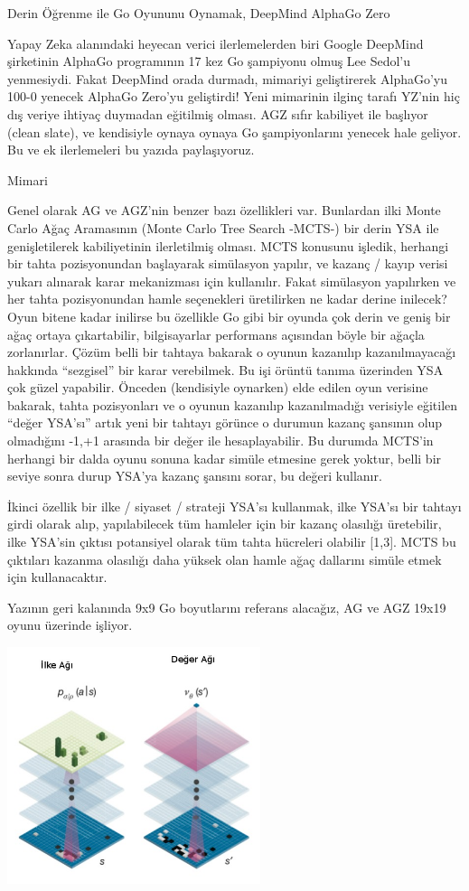 \documentclass[12pt,fleqn]{article}\usepackage{../../common}
\begin{document}
Derin Öğrenme ile Go Oyununu Oynamak, DeepMind AlphaGo Zero

Yapay Zeka alanındaki heyecan verici ilerlemelerden biri Google DeepMind
şirketinin AlphaGo programının 17 kez Go şampiyonu olmuş Lee Sedol'u
yenmesiydi. Fakat DeepMind orada durmadı, mimariyi geliştirerek AlphaGo'yu
100-0 yenecek AlphaGo Zero'yu geliştirdi! Yeni mimarinin ilginç tarafı
YZ'nin hiç dış veriye ihtiyaç duymadan eğitilmiş olması. AGZ sıfır
kabiliyet ile başlıyor (clean slate), ve kendisiyle oynaya oynaya Go
şampiyonlarını yenecek hale geliyor.  Bu ve ek ilerlemeleri bu yazıda
paylaşıyoruz.

Mimari

Genel olarak AG ve AGZ'nin benzer bazı özellikleri var. Bunlardan ilki
Monte Carlo Ağaç Aramasının (Monte Carlo Tree Search -MCTS-) bir derin YSA
ile genişletilerek kabiliyetinin ilerletilmiş olması. MCTS konusunu
işledik, herhangi bir tahta pozisyonundan başlayarak simülasyon yapılır, ve
kazanç / kayıp verisi yukarı alınarak karar mekanizması için
kullanılır. Fakat simülasyon yapılırken ve her tahta pozisyonundan hamle
seçenekleri üretilirken ne kadar derine inilecek? Oyun bitene kadar
inilirse bu özellikle Go gibi bir oyunda çok derin ve geniş bir ağaç ortaya
çıkartabilir, bilgisayarlar performans açısından böyle bir ağaçla
zorlanırlar. Çözüm belli bir tahtaya bakarak o oyunun kazanılıp
kazanılmayacağı hakkında ``sezgisel'' bir karar verebilmek. Bu işi örüntü
tanıma üzerinden YSA çok güzel yapabilir. Önceden (kendisiyle oynarken)
elde edilen oyun verisine bakarak, tahta pozisyonları ve o oyunun kazanılıp
kazanılmadığı verisiyle eğitilen ``değer YSA'sı'' artık yeni bir tahtayı
görünce o durumun kazanç şansının olup olmadığını -1,+1 arasında bir değer
ile hesaplayabilir. Bu durumda MCTS'in herhangi bir dalda oyunu sonuna
kadar simüle etmesine gerek yoktur, belli bir seviye sonra durup YSA'ya
kazanç şansını sorar, bu değeri kullanır.

İkinci özellik bir ilke / siyaset / strateji YSA'sı kullanmak, ilke YSA'sı
bir tahtayı girdi olarak alıp, yapılabilecek tüm hamleler için bir kazanç
olasılığı üretebilir, ilke YSA'sin çıktısı potansiyel olarak tüm tahta
hücreleri olabilir [1,3]. MCTS bu çıktıları kazanma olasılığı daha yüksek
olan hamle ağaç dallarını simüle etmek için kullanacaktır.

Yazının geri kalanında 9x9 Go boyutlarını referans alacağız, AG ve AGZ
19x19 oyunu üzerinde işliyor. 

\includegraphics[width=20em]{go_02.jpg}
\end{document}
